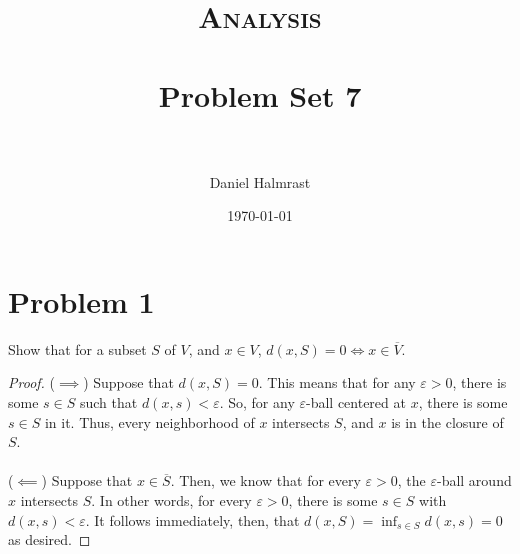 \documentclass[fontsize=11pt]{scrartcl} %
\title{	
\normalfont \normalsize 
\textsc{Analysis} \\ [25pt] %
\horrule{0.5pt} \\[0.4cm] %
\huge Problem Set 7 \\ %
\horrule{2pt} \\[0.5cm] %
}
\author{Daniel Halmrast} %
\date{\normalsize\today} %
\numberwithin{equation}{section} %
\numberwithin{figure}{section} %
\numberwithin{table}{section} %
\begin{document}
\maketitle %

\section*{Problem 1}
Show that for a subset $S$ of $V$, and $x\in V$, $d(x,S)=0 \iff
x\in\overline{V}$.
\\
\begin{proof}
    ($\implies$)
    Suppose that $d(x,S)=0$. This means that for any $\varepsilon > 0$, there is
    some $s\in S$ such that $d(x,s)<\varepsilon$.
    So, for any $\varepsilon$-ball centered at $x$, there is some $s\in S$ in
    it. Thus, every neighborhood of $x$ intersects $S$, and $x$ is in the
    closure of $S$.
    \\
    \\
    ($\impliedby$)
    Suppose that $x\in \overline{S}$. Then, we know that for every $\varepsilon
    >0$, the $\varepsilon$-ball around $x$ intersects $S$. In other words, for
    every $\varepsilon >0$, there is some $s\in S$ with $d(x,s)<\varepsilon$.
    It follows immediately, then, that $d(x,S)=\inf_{s\in S}d(x,s)=0$ as
    desired.
\end{proof}

\newpage
\end{document}
